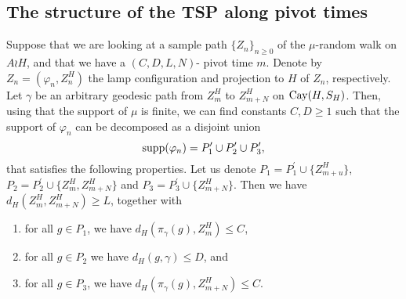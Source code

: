 \subsection{The structure of the TSP along pivot times}

	Suppose that we are looking at a sample path $\{Z_n\}_{n\ge 0}$ of the $\mu$-random walk on $A\wr H$, and that we have a $(C,D,L,N)$- pivot time $m$. Denote by $Z_n=(\varphi_n,Z_n^H)$ the lamp configuration and projection to $H$ of $Z_n$, respectively. Let  $\gamma$ be an arbitrary geodesic path from $Z_m^{H}$ to $Z^{H}_{m+N}$ on $\mathrm{Cay}(H,S_H)$. Then, using that the support of $\mu$ is finite, we can find constants $C,D\ge 1$ such that the support of $\varphi_n$ can be decomposed as a disjoint union \[\mathrm{supp}(\varphi_n)=P^{\prime}_1\cup P^{\prime}_2\cup P^{\prime}_3,\]
that satisfies the following properties. Let us denote $P_1=P^{\prime}_1\cup\{Z^{H}_{m+u}\}$, $P_2=P^{\prime}_2\cup \{Z^{H}_{m}, Z^{H}_{m+N}\}$ and  $P_3=P^{\prime}_3\cup \{Z^{H}_{m+N}\}$. Then we have $d_H(Z_m^H,Z_{m+N}^H)\ge L$, together with
\begin{enumerate}
	\item for all $g\in P_1$, we have $d_H\left( \pi_{\gamma}(g) ,Z_m^H  \right)\le C$,
	\item for all $g\in P_2$ we have $d_H(g,\gamma)\le D$, and
	\item for all $g\in P_3$, we have $d_H\left( \pi_{\gamma}(g),Z^H_{m+N} \right)\le C$.
\end{enumerate}



